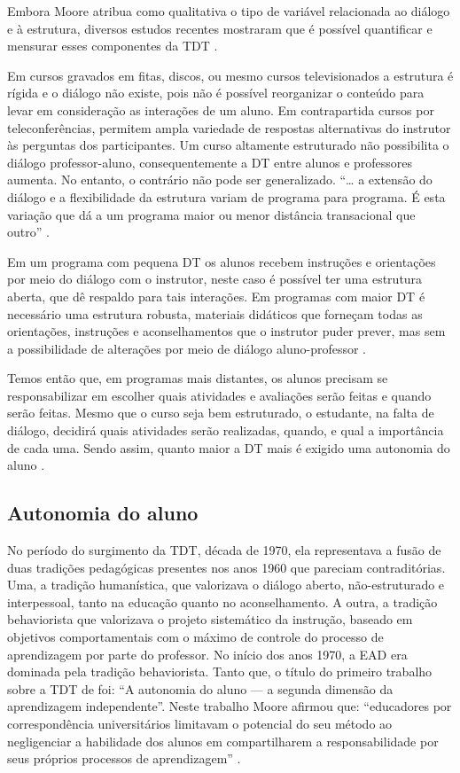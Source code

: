 Embora Moore atribua como qualitativa o tipo de variável relacionada ao diálogo
e à estrutura, diversos estudos recentes mostraram que é possível quantificar e
mensurar esses componentes da TDT
\cite{zhang2003transactional,horzum2011developing,paul2015revisiting,
ramos2016abordagem}.

Em cursos gravados em fitas, discos, ou mesmo cursos televisionados a estrutura
é rígida e o diálogo não existe, pois não é possível reorganizar o conteúdo para
levar em consideração as interações de um aluno. Em contrapartida cursos por
teleconferências, permitem ampla variedade de respostas alternativas do
instrutor às perguntas dos participantes. Um curso altamente estruturado não
possibilita o diálogo professor-aluno, consequentemente a DT entre alunos e
professores aumenta. No entanto, o contrário não pode ser generalizado. ``\ldots
a extensão do diálogo e a flexibilidade da estrutura variam de programa para
programa. É esta variação que dá a um programa maior ou menor distância
transacional que outro'' \cite{moore2008teoria}.

Em um programa com pequena DT os alunos recebem instruções e orientações por
meio do diálogo com o instrutor, neste caso é possível ter uma estrutura aberta,
que dê respaldo para tais interações. Em programas com maior DT é necessário uma
estrutura robusta, materiais didáticos que forneçam todas as orientações,
instruções e aconselhamentos que o instrutor puder prever, mas sem a
possibilidade de alterações por meio de diálogo aluno-professor
\cite{moore2008teoria}.

Temos então que, em programas mais distantes, os alunos precisam se
responsabilizar em escolher quais atividades e avaliações serão feitas e quando
serão feitas. Mesmo que o curso seja bem estruturado, o estudante, na falta de
diálogo, decidirá quais atividades serão realizadas, quando, e qual a
importância de cada uma. Sendo assim, quanto maior a DT mais é exigido uma
autonomia do aluno \cite{moore2008teoria}.


\subsection{Autonomia do aluno}

No período do surgimento da TDT, década de 1970, ela representava a fusão de
duas tradições pedagógicas presentes nos anos 1960 que pareciam contraditórias.
Uma, a tradição humanística, que valorizava o diálogo aberto, não-estruturado e
interpessoal, tanto na educação quanto no aconselhamento. A outra, a tradição
behaviorista que valorizava o projeto sistemático da instrução, baseado em
objetivos comportamentais com o máximo de controle do processo de aprendizagem
por parte do professor. No início dos anos 1970, a EAD era dominada pela
tradição behaviorista. Tanto que, o título do primeiro trabalho sobre a TDT de
 foi: ``A autonomia do aluno --- a segunda dimensão
da aprendizagem independente''. Neste trabalho Moore afirmou que: ``educadores
por correspondência universitários limitavam o potencial do seu método ao
negligenciar a habilidade dos alunos em compartilharem a responsabilidade por
seus próprios processos de aprendizagem'' \cite{moore2008teoria}.

